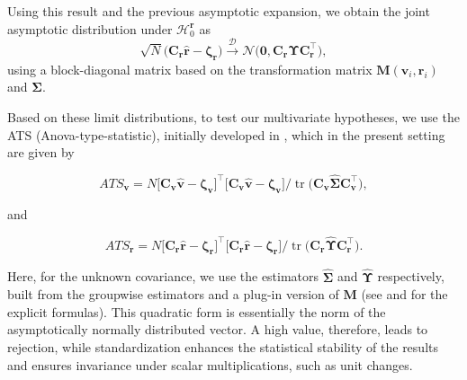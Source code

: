 Using this result and the previous asymptotic expansion, we obtain the joint
asymptotic distribution under \(\mathcal{H}_0^{\boldsymbol{r}}\) as
\begin{equation}
\sqrt{N}
\bigl(
\boldsymbol{C}_{\boldsymbol{r}} \widehat{\boldsymbol{r}}
- \boldsymbol{\zeta}_{\boldsymbol{r}}
\bigr)
\stackrel{\mathcal D}{\longrightarrow}
\mathcal{N}
\bigl(
\mathbf{0},
\boldsymbol{C}_{\boldsymbol{r}} \boldsymbol{\Upsilon} \boldsymbol{C}_{\boldsymbol{r}}^\top
\bigr),
\label{eq:cor-limit}
\end{equation}
using a block-diagonal matrix based on the transformation matrix
\(\boldsymbol{M}(\boldsymbol{v}_i, \boldsymbol{r}_i)\) and \(\boldsymbol{\Sigma}\).

Based on these limit distributions, to test our multivariate hypotheses, we use
the ATS (Anova-type-statistic), initially developed in
\citet{brunner1997}, which in the present setting are given by

\begin{equation}
ATS_{\boldsymbol{v}}
=
N
\bigl[
\boldsymbol{C}_{\boldsymbol{v}}
\widehat{\boldsymbol{v}} - \boldsymbol{\zeta}_{\boldsymbol{v}}
\bigr]^\top
\bigl[
\boldsymbol{C}_{\boldsymbol{v}}
\widehat{\boldsymbol{v}} - \boldsymbol{\zeta}_{\boldsymbol{v}}
\bigr]
\Big/
\operatorname{tr}
\bigl(
\boldsymbol{C}_{\boldsymbol{v}} \widehat{\boldsymbol{\Sigma}} \boldsymbol{C}_{\boldsymbol{v}}^\top
\bigr),
\label{eq:ATS1}
\end{equation}

and

\begin{equation}
ATS_{\boldsymbol{r}}
=
N
\bigl[
\boldsymbol{C}_{\boldsymbol{r}}
\widehat{\boldsymbol{r}} - \boldsymbol{\zeta}_{\boldsymbol{r}}
\bigr]^\top
\bigl[
\boldsymbol{C}_{\boldsymbol{r}}
\widehat{\boldsymbol{r}} - \boldsymbol{\zeta}_{\boldsymbol{r}}
\bigr]
\Big/
\operatorname{tr}
\bigl(
\boldsymbol{C}_{\boldsymbol{r}} \widehat{\boldsymbol{\Upsilon}} \boldsymbol{C}_{\boldsymbol{r}}^\top
\bigr).
\label{eq:ATS2}
\end{equation}

Here, for the unknown covariance, we use the estimators
\(\widehat{\boldsymbol{\Sigma}}\) and \(\widehat{\boldsymbol{\Upsilon}}\) respectively, built from the
groupwise estimators and a plug-in version of \(\boldsymbol{M}\) (see
\citet{sattler2022} and \citet{sattler2023} for the explicit formulas).
This quadratic form is essentially the norm of the asymptotically normally
distributed vector. A high value, therefore, leads to rejection, while
standardization enhances the statistical stability of the results and ensures
invariance under scalar multiplications, such as unit changes.

